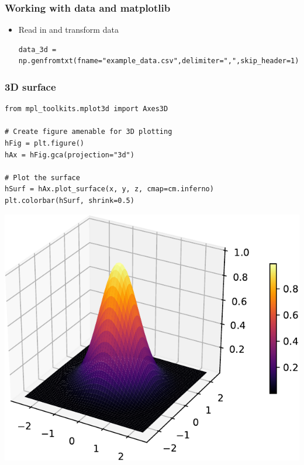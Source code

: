 \documentclass[xcolor=table]{beamer}
\begin{document}
\begin{frame}[fragile]
\frametitle{Working with data and matplotlib}
\begin{itemize}
    \item Read in and transform data
\begin{lstlisting}[style=python]
data_3d = np.genfromtxt(fname="example_data.csv",delimiter=",",skip_header=1)

\end{lstlisting}
\end{itemize}
\end{frame}
\begin{frame}[fragile]
\frametitle{3D surface}

\tiny
\begin{lstlisting}[style=python]
from mpl_toolkits.mplot3d import Axes3D

# Create figure amenable for 3D plotting
hFig = plt.figure()
hAx = hFig.gca(projection="3d")

# Plot the surface
hSurf = hAx.plot_surface(x, y, z, cmap=cm.inferno)
plt.colorbar(hSurf, shrink=0.5)
\end{lstlisting}

\vspace{-0.8cm}
\begin{center}
	\includegraphics[width=.42\textwidth]{plot6.pdf}
\end{center}

\end{frame}
\end{document}
